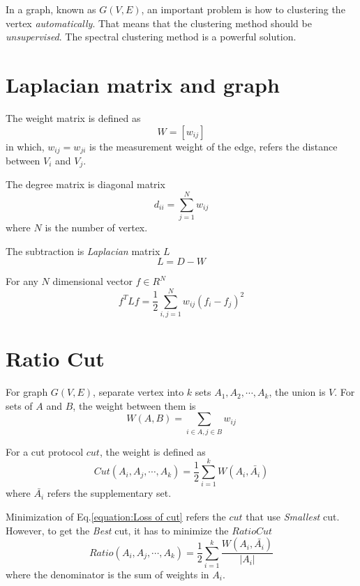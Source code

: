 \documentclass[a4paper]{article}
\begin{document}
\abstract
In a graph, known as $G(V, E)$, an important problem is how to clustering the vertex \emph{automatically}.
That means that the clustering method should be \emph{unsupervised}.
The spectral clustering method is a powerful solution.

\section {Laplacian matrix and graph}
The weight matrix is defined as
\begin{equation*}
    W = [w_{ij}]
\end{equation*}
in which, $w_{ij}=w_{ji}$ is the measurement weight of the edge, refers the distance between $V_i$ and $V_j$.

The degree matrix is diagonal matrix
\begin{equation*}
    d_{ii} = \sum_{j=1}^{N}w_{ij}
\end{equation*}
where $N$ is the number of vertex.

The subtraction is \emph{Laplacian} matrix $L$
\begin{equation}
    \label{equation: Laplacian matrix}
    L = D - W
\end{equation}

For any $N$ dimensional vector $f \in R^N$
\begin{equation}
    \label{equation: Laplacian matrix times vector}
    f^T L f = \frac{1}{2} \sum_{i, j=1}^{N} w_{ij}(f_i - f_j)^2
\end{equation}

\section{Ratio Cut}
For graph $G(V, E)$, separate vertex into $k$ sets $A_1, A_2, \cdots , A_k$, the union is $V$.
For sets of $A$ and $B$, the weight between them is
\begin{equation*}
    W(A, B) = \sum_{i \in A, j \in B} w_{ij}
\end{equation*}

For a cut protocol $cut$, the weight is defined as
\begin{equation}
    \label{equation:Loss of cut}
    Cut(A_i, A_j, \cdots, A_k) = \frac{1}{2} \sum_{i=1}^{k} W(A_i, \bar{A_i})
\end{equation}
where $\bar{A_i}$ refers the supplementary set.

Minimization of Eq.\ref{equation:Loss of cut} refers the $cut$ that use \emph{Smallest} cut.
However, to get the \emph{Best} cut, it has to minimize the $RatioCut$
\begin{equation}
    \label{equation:Loss of ratio cut}
    Ratio(A_i, A_j, \cdots, A_k) = \frac{1}{2} \sum_{i=1}^{k} \frac{W(A_i, \bar{A_i})}{|A_i|}
\end{equation}
where the denominator is the sum of weights in $A_i$.
\end{document}
